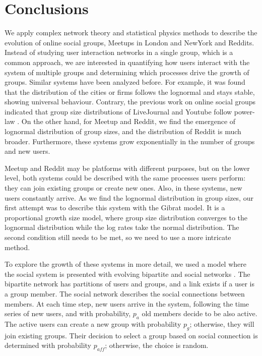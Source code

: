 \newpage
\section{Conclusions}

We apply complex network theory and statistical physics methods to describe the evolution of online social groups, Meetups in London and NewYork and Reddits. Instead of studying user interaction networks in a single group, which is a common approach, we are interested in quantifying how users interact with the system of multiple groups and determining which processes drive the growth of groups. Similar systems have been analyzed before. For example, it was found that the distribution of the cities or firms follows the lognormal and stays stable, showing universal behaviour. Contrary, the previous work on online social groups indicated that group size distributions of LiveJournal and Youtube follow power-law \cite{zheleva2009co}. On the other hand, for Meetup and Reddit, we find the emergence of lognormal distribution of group sizes, and the distribution of Reddit is much broader. Furthermore, these systems grow exponentially in the number of groups and new users. 

Meetup and Reddit may be platforms with different purposes, but on the lower level, both systems could be described with the same processes users perform: they can join existing groups or create new ones. Also, in these systems, new users constantly arrive. As we find the lognormal distribution in group sizes, our first attempt was to describe this system with the Gibrat model. It is a proportional growth size model, where group size distribution converges to the lognormal distribution while the log rates take the normal distribution. The second condition still needs to be met, so we need to use a more intricate method.

To explore the growth of these systems in more detail, we used a model where the social system is presented with evolving bipartite and social networks \cite{zheleva2009co}. The bipartite network has partitions of users and groups, and a link exists if a user is a group member. The social network describes the social connections between members. At each time step, new users arrive in the system, following the time series of new users, and with probability, $p_a$ old members decide to be also active. The active users can create a new group with probability $p_g$; otherwise, they will join existing groups. Their decision to select a group based on social connection is determined with probability $p_{aff}$; otherwise, the choice is random. %


